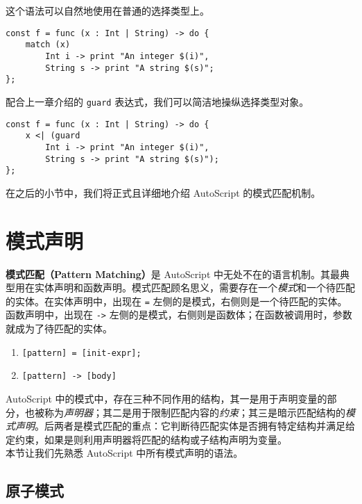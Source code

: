 这个语法可以自然地使用在普通的选择类型上。

\begin{lstlisting}
const f = func (x : Int | String) -> do {
	match (x)
		Int i -> print "An integer $(i)",
		String s -> print "A string $(s)";
};
\end{lstlisting}

配合上一章介绍的 \lstinline!guard! 表达式，我们可以简洁地操纵选择类型对象。

\begin{lstlisting}
const f = func (x : Int | String) -> do {
	x <| (guard
		Int i -> print "An integer $(i)",
		String s -> print "A string $(s)");
};
\end{lstlisting}

在之后的小节中，我们将正式且详细地介绍 AutoScript 的模式匹配机制。


\section{模式声明}

\textbf{模式匹配（Pattern Matching）}是 AutoScript 中无处不在的语言机制。其最典型用在实体声明和函数声明。模式匹配顾名思义，需要存在一个\emph{模式}和一个待匹配的实体。在实体声明中，出现在 \lstinline!=! 左侧的是模式，右侧则是一个待匹配的实体。函数声明中，出现在 \lstinline!->! 左侧的是模式，右侧则是函数体；在函数被调用时，参数就成为了待匹配的实体。

\begin{grammar}[模式匹配]
\begin{enumerate}
    \item \lstinline![pattern] = [init-expr];!
    \item \lstinline![pattern] -> [body]!
\end{enumerate}
\end{grammar}


AutoScript 中的模式中，存在三种不同作用的结构，其一是用于声明变量的部分，也被称为\emph{声明器}；其二是用于限制匹配内容的\emph{约束}；其三是暗示匹配结构的\emph{模式声明}。后两者是模式匹配的重点：它判断待匹配实体是否拥有特定结构并满足给定约束，如果是则利用声明器将匹配的结构或子结构声明为变量。 \\

本节让我们先熟悉 AutoScript 中所有模式声明的语法。

\subsection{原子模式}

